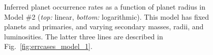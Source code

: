 \begin{figure}
\centering
{}
\caption{
Inferred planet occurrence rates as a function of planet radius in Model \#2 
({\it top:} linear, {\it bottom:} logarithmic).
This model has fixed planets and primaries, and varying secondary masses, 
radii, and luminosities.
The latter three lines are described in Fig.~\ref{fig:errcases_model_1}.
\label{fig:errcases_model_2}}
\end{figure}

